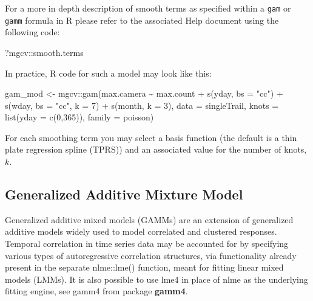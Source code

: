 \documentclass[
]{book}
\newenvironment{Shaded}{\begin{snugshade}}{\end{snugshade}}
\newcommand{\AttributeTok}[1]{\textcolor[rgb]{0.77,0.63,0.00}{#1}}
\newcommand{\DecValTok}[1]{\textcolor[rgb]{0.00,0.00,0.81}{#1}}
\newcommand{\FunctionTok}[1]{\textcolor[rgb]{0.00,0.00,0.00}{#1}}
\newcommand{\NormalTok}[1]{#1}
\newcommand{\OtherTok}[1]{\textcolor[rgb]{0.56,0.35,0.01}{#1}}
\newcommand{\SpecialCharTok}[1]{\textcolor[rgb]{0.00,0.00,0.00}{#1}}
\newcommand{\StringTok}[1]{\textcolor[rgb]{0.31,0.60,0.02}{#1}}
\begin{document}
For a more in depth description of smooth terms as specified within a
\texttt{gam} or \texttt{gamm} formula in R please refer to the associated Help
document using the following code:

\begin{Shaded}
\begin{Highlighting}[]
\NormalTok{?mgcv}\SpecialCharTok{::}\NormalTok{smooth.terms }
\end{Highlighting}
\end{Shaded}

In practice, R code for such a model may look like this:

\begin{Shaded}
\begin{Highlighting}[]
\NormalTok{gam\_mod }\OtherTok{\textless{}{-}}\NormalTok{ mgcv}\SpecialCharTok{::}\FunctionTok{gam}\NormalTok{(max.camera }\SpecialCharTok{\textasciitilde{}}\NormalTok{ max.count }\SpecialCharTok{+} 
                       \FunctionTok{s}\NormalTok{(yday, }\AttributeTok{bs =} \StringTok{"cc"}\NormalTok{) }\SpecialCharTok{+} 
                       \FunctionTok{s}\NormalTok{(wday, }\AttributeTok{bs =} \StringTok{"cc"}\NormalTok{,  }\AttributeTok{k =} \DecValTok{7}\NormalTok{) }\SpecialCharTok{+}
                       \FunctionTok{s}\NormalTok{(month, }\AttributeTok{k =} \DecValTok{3}\NormalTok{), }
                     \AttributeTok{data =}\NormalTok{ singleTrail, }
                     \AttributeTok{knots =} \FunctionTok{list}\NormalTok{(}\AttributeTok{yday =} \FunctionTok{c}\NormalTok{(}\DecValTok{0}\NormalTok{,}\DecValTok{365}\NormalTok{)),}
                     \AttributeTok{family =}\NormalTok{ poisson)}
\end{Highlighting}
\end{Shaded}

For each smoothing term you may select a basis function (the default is
a thin plate regression spline (TPRS)) and an associated value for the
number of knots, \(k\).

\hypertarget{generalized-additive-mixture-model}{%
\subsection{Generalized Additive Mixture Model}\label{generalized-additive-mixture-model}}

Generalized additive mixed models (GAMMs) are an extension of
generalized additive models widely used to model correlated and
clustered responses. Temporal correlation in time series data may be
accounted for by specifying various types of autoregressive correlation
structures, via functionality already present in the separate
nlme::lme() function, meant for fitting linear mixed models (LMMs). It
is also possible to use lme4 in place of nlme as the underlying fitting
engine, see gamm4 from package \textbf{gamm4}.
\end{document}
